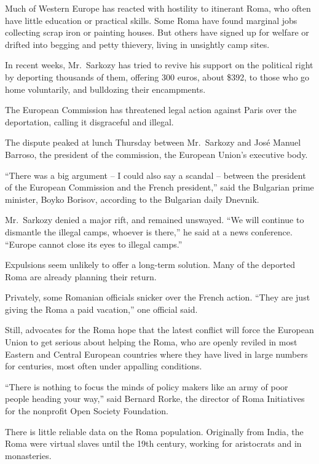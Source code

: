 ﻿\documentclass[12pt]{article}
\begin{document}
Much of Western Europe has reacted with hostility to itinerant Roma, who often have little education
or practical skills. Some Roma have found marginal jobs collecting scrap iron or painting houses.
But others have signed up for welfare or drifted into begging and petty thievery, living in
unsightly camp sites.

In recent weeks, Mr.~Sarkozy has tried to revive his support on the political right by deporting
thousands of them, offering 300 euros, about \$392, to those who go home voluntarily, and bulldozing
their encampments.

The European Commission has threatened legal action against Paris over the deportation, calling it
disgraceful and illegal.

The dispute peaked at lunch Thursday between Mr.~Sarkozy and Jos\'e Manuel Barroso, the president of
the commission, the European Union's executive body.

``There was a big argument -- I could also say a scandal -- between the president of the European
Commission and the French president,'' said the Bulgarian prime minister, Boyko Borisov, according
to the Bulgarian daily Dnevnik.

Mr.~Sarkozy denied a major rift, and remained unswayed. ``We will continue to dismantle the illegal
camps, whoever is there,'' he said at a news conference. ``Europe cannot close its eyes to illegal
camps.''

Expulsions seem unlikely to offer a long-term solution. Many of the deported Roma are already
planning their return.

Privately, some Romanian officials snicker over the French action. ``They are just giving the Roma a
paid vacation,'' one official said.

Still, advocates for the Roma hope that the latest conflict will force the European Union to get
serious about helping the Roma, who are openly reviled in most Eastern and Central European
countries where they have lived in large numbers for centuries, most often under appalling
conditions.

``There is nothing to focus the minds of policy makers like an army of poor people heading your
way,'' said Bernard Rorke, the director of Roma Initiatives for the nonprofit Open Society
Foundation.

There is little reliable data on the Roma population. Originally from India, the Roma were virtual
slaves until the 19th century, working for aristocrats and in monasteries.
\end{document}
